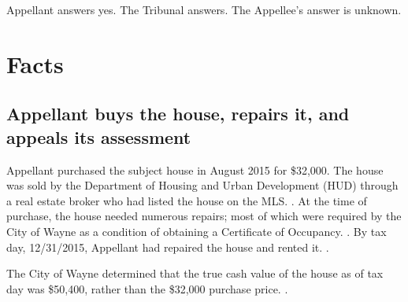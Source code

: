 \documentclass[12pt,\documentclassflag]{michiganCourtOfAppealsBrief}
\begin{document}
Appellant answers yes. The Tribunal answers. The Appellee's answer is unknown. 








 
\newpage

\section{Facts}
\label{facts}
\subsection{Appellant buys the house, repairs it, and appeals its assessment}

Appellant purchased the subject house in August 2015 for \$32,000. The house was sold by the Department of Housing and Urban Development (HUD) through a real estate broker who had listed the house on the MLS. \mlsListing[]. At the time of purchase, the house needed numerous repairs; most of which were required by the City of Wayne as a condition of obtaining a Certificate of Occupancy. \repairs[]. By tax day, 12/31/2015, Appellant had repaired the house and rented it. \foj[4-5].

The City of Wayne determined that the true cash value of the house as of tax day was \$50,400, rather than the \$32,000 purchase price. \boardOfReviewDecision.
\end{document}
